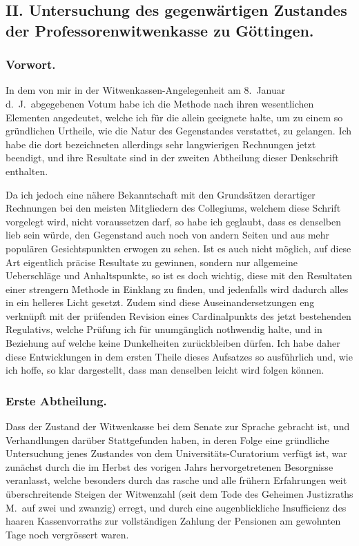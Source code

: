 \documentclass[12pt,a4paper]{article}
\begin{document}
\newpage
\subsection*{II. Untersuchung des gegenw\"artigen Zustandes der Professorenwitwenkasse zu G\"ottingen.}

\subsubsection*{Vorwort.}

In dem von mir in der Witwenkassen-Angelegenheit am 8.\ Januar d.\ J.\ abgegebenen Votum habe ich die Methode nach ihren wesentlichen Elementen angedeutet, welche ich f\"ur die allein geeignete halte, um zu einem so gr\"undlichen Urtheile, wie die Natur des Gegenstandes verstattet, zu gelangen. Ich habe die dort bezeichneten allerdings sehr langwierigen Rechnungen jetzt beendigt, und ihre Resultate sind in der zweiten Abtheilung dieser Denkschrift enthalten.

Da ich jedoch eine n\"ahere Bekanntschaft mit den Grunds\"atzen derartiger Rechnungen bei den meisten Mitgliedern des Collegiums, welchem diese Schrift vorgelegt wird, nicht voraussetzen darf, so habe ich geglaubt, dass es denselben lieb sein w\"urde, den Gegenstand auch noch von andern Seiten und aus mehr popul\"aren Gesichtspunkten erwogen zu sehen. Ist es auch nicht m\"oglich, auf diese Art eigentlich pr\"acise Resultate zu gewinnen, sondern nur allgemeine Ueberschl\"age und Anhaltspunkte, so ist es doch wichtig, diese mit den Resultaten einer strengern Methode in Einklang zu finden, und jedenfalls wird dadurch alles in ein helleres Licht gesetzt. Zudem sind diese Auseinandersetzungen eng verkn\"upft mit der pr\"ufenden Revision eines Cardinalpunkts des jetzt bestehenden Regulativs, welche Pr\"ufung ich f\"ur unumg\"anglich nothwendig halte, und in Beziehung auf welche keine Dunkelheiten zur\"uckbleiben d\"urfen. Ich habe daher diese Entwicklungen in dem ersten Theile dieses Aufsatzes so ausf\"uhrlich und, wie ich hoffe, so klar dargestellt, dass man denselben leicht wird folgen k\"onnen.

\subsubsection*{Erste Abtheilung.}

Dass der Zustand der Witwenkasse bei dem Senate zur Sprache gebracht ist, und Verhandlungen dar\"uber Stattgefunden haben, in deren Folge eine gr\"undliche Untersuchung jenes Zustandes von dem Universit\"ats-Curatorium verf\"ugt ist, war zun\"achst durch die im Herbst des vorigen Jahrs hervorgetretenen Besorgnisse veranlasst, welche besonders durch das rasche und alle fr\"uhern Erfahrungen weit \"uberschreitende Steigen der Witwenzahl (seit dem Tode des Geheimen Justizraths M.\ auf zwei und zwanzig) erregt, und durch eine augenblickliche Insufficienz des haaren Kassenvorraths zur vollst\"andigen Zahlung der Pensionen am gewohnten Tage noch vergr\"ossert waren.
\end{document}
